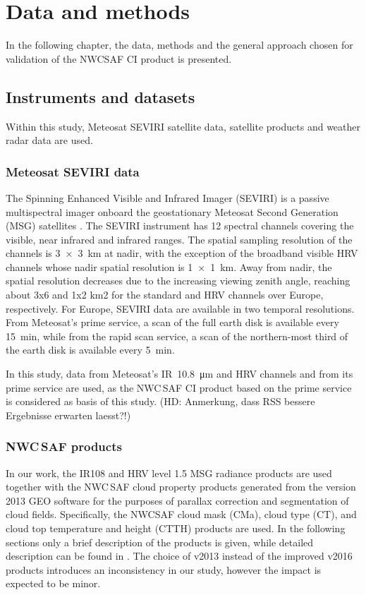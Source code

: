 \chapter{Data and methods}
In the following chapter, the data, methods and the general approach chosen for validation of the NWCSAF CI product is presented.

\section{Instruments and datasets}
Within this study, Meteosat SEVIRI satellite data, satellite products and weather radar data are used. 

\subsection{Meteosat SEVIRI data}
The Spinning Enhanced Visible and Infrared Imager (SEVIRI) is a passive multispectral imager onboard the geostationary Meteosat Second Generation (MSG) satellites \citep{Schmetz2002}. The SEVIRI instrument has 12 spectral channels covering the visible, near infrared and infrared ranges. The spatial sampling resolution of the channels is \SI{3x3}{\kilo\metre} at nadir, with the exception of the broadband visible HRV channels whose nadir spatial resolution is \SI{1x1}{\kilo\metre}. Away from nadir, the spatial resolution decreases due to the increasing viewing zenith angle, reaching about 3x6 and 1x2 km2 for the standard and HRV channels over Europe, respectively. For Europe, SEVIRI data are available in two temporal resolutions. From Meteosat's prime service, a scan of the full earth disk is available every \SI{15}{\minute}, while from the rapid scan service, a scan of the northern-most third of the earth disk is available every \SI{5}{\minute}.

In this study, data from Meteosat's IR~\SI{10.8}{\micro\metre} and HRV channels and from its prime service are used, as the NWC\,SAF CI product based on the prime service is considered as basis of this study. (HD: Anmerkung, dass RSS bessere Ergebnisse erwarten laesst?!)

\subsection{NWC\,SAF products}
In our work,  the IR108 and HRV level 1.5 MSG radiance products are used together with the NWC\,SAF cloud property products generated from the version 2013 GEO software for the purposes of parallax correction and segmentation of cloud fields. Specifically, the NWCSAF  cloud mask (CMa), cloud type (CT), and cloud top temperature and height (CTTH) products are used. In the following sections only a brief description of the products is given, while detailed description can be found in \citet{NWCSAFWolken2014}. The choice of v2013 instead of the improved v2016 products introduces an inconsistency in our study, however the impact is expected to be minor.

